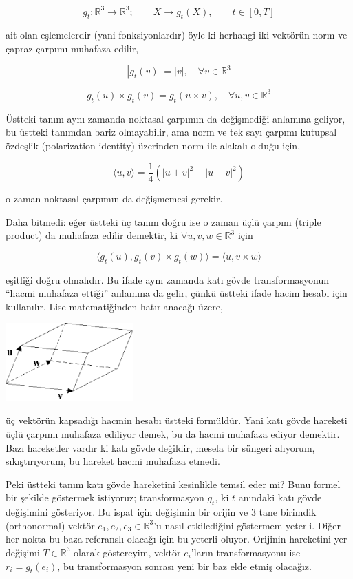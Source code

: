 \documentclass[12pt,fleqn]{article}\usepackage{../../common}
\begin{document}
$$ g_t: \mathbb{R}^3 \to \mathbb{R}^3; \qquad X \to g_t(X), \qquad t \in [0,T] $$

ait olan eşlemelerdir (yani fonksiyonlardır) öyle ki herhangi iki vektörün
norm ve çapraz çarpımı muhafaza edilir,

$$ |g_t(v)| = |v|, \quad \forall v \in \mathbb{R}^3 $$

$$ g_t(u) \times g_t(v) = g_t(u \times v), \quad \forall u,v \in \mathbb{R}^3 $$

Üstteki tanım aynı zamanda noktasal çarpımın da değişmediği anlamına
geliyor, bu üstteki tanımdan bariz olmayabilir, ama norm ve tek sayı
çarpımı kutupsal özdeşlik (polarization identity) üzerinden norm ile
alakalı olduğu için, 

$$ \langle u,v \rangle = \frac{1}{4} ( |u+v|^2 - |u-v|^2 ) $$

o zaman noktasal çarpımın da değişmemesi gerekir. 

Daha bitmedi: eğer üstteki üç tanım doğru ise o zaman üçlü çarpım (triple
product) da muhafaza edilir demektir, ki $\forall u,v,w \in \mathbb{R}^3$ için

$$ \langle g_t(u), g_t(v) \times g_t(w) \rangle = \langle u, v\times w \rangle  $$

eşitliği doğru olmalıdır. Bu ifade aynı zamanda katı gövde transformasyonun
``hacmi muhafaza ettiği'' anlamına da gelir, çünkü üstteki ifade hacim
hesabı için kullanılır. Lise matematiğinden hatırlanacağı üzere,

\includegraphics[height=3cm]{volume.png}

üç vektörün kapsadığı hacmin hesabı üstteki formüldür. Yani katı gövde
hareketi üçlü çarpımı muhafaza ediliyor demek, bu da hacmi muhafaza ediyor
demektir. Bazı hareketler vardır ki katı gövde değildir, mesela bir süngeri
alıyorum, sıkıştırıyorum, bu hareket hacmi muhafaza etmedi.

Peki üstteki tanım katı gövde hareketini kesinlikle temsil eder mi? Bunu
formel bir şekilde göstermek istiyoruz; transformasyon $g_t$, ki $t$
anındaki katı gövde değişimini gösteriyor. Bu ispat için değişimin bir
orijin ve 3 tane birimdik (orthonormal) vektör $e_1,e_2,e_3 \in
\mathbb{R}^3$'u nasıl etkilediğini göstermem yeterli. Diğer her nokta bu
baza referanslı olacağı için bu yeterli oluyor. Orijinin hareketini yer
değişimi $T \in \mathbb{R}^3$ olarak göstereyim, vektör $e_i$'ların
transformasyonu ise $r_i = g_t(e_i)$, bu transformasyon sonrası yeni bir
baz elde etmiş olacağız.
\end{document}
